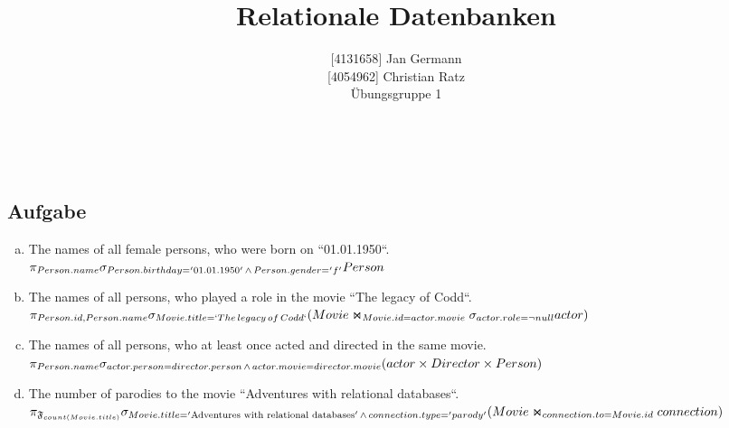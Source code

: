 \documentclass[11pt,a4paper,DIV=9]{scrartcl}
\author{{[}4131658{]} Jan Germann \\{[}4054962{]} Christian Ratz\\Übungsgruppe 1}
\title{Relationale Datenbanken}
\newcounter{temp}
\newcommand{\aufgabe}[1]{
  \setcounter{temp}{\value{subsection}}
  \setcounter{subsection}{#1}
  \addtocounter{subsection}{-1}
  \subsection{Aufgabe}
  \setcounter{subsection}{\value{temp}}
}
\renewcommand{\author}[1]{\renewcommand{\author}{#1}}
\renewcommand{\title}[1]{\renewcommand{\title}{#1}}
\newcommand{\makehomeworktitle}{
  \begin{minipage}[t]{6.5cm}
    \sf{\author}
  \end{minipage}
  \begin{minipage}[t]{6.5cm}
    \begin{flushright}
      \sf{\title\\\today}
    \end{flushright}
  \end{minipage}
  \\[0.2cm]
  \begin{center}
    \sf{
      \color{blue}{
        \LARGE{Aufgabenblatt \blattnr}
      }
    }
  \end{center}
  \vspace{0.1cm}
}
\begin{document}
\makehomeworktitle
\aufgabe{1}
  \begin{enumerate}[a)]
    \item The names of all female persons, who were born on ``01.01.1950``.\hfill\\
      $
      \pi_{Person.name}\\
      \sigma_{Person.birthday = '01.01.1950'\,\wedge\,Person.gender = 'f'}\\
      Person
      $
    \item The names of all persons, who played a role in the movie ``The legacy of Codd``. \hfill\\
      $
      \pi _{Person.id, Person.name}\\
      \sigma _{Movie.title=`{The\, legacy\, of\, Codd`}}\\
      (Movie\Join_{Movie.id = actor.movie} \sigma _{actor.role = \neg null} actor)
      $
    \item The names of all persons, who at least once acted and directed in the same movie.\hfill\\
      $
      \pi _{Person.name}\\
      \sigma _{actor.person = director.person \,\wedge\, actor.movie = director.movie}\\
      (actor \times Director \times Person)
      $
    \item The number of parodies to the movie ``Adventures with relational databases``.
      $
      \pi_{\mathfrak{F}_{count(Movie.title)}} \\
      \sigma_{Movie.title = '\textrm{Adventures with relational databases}' \,\wedge\, connection.type = 'parody'}\\
      (Movie\Join_{connection.to = Movie.id}connection)
      $


\end{enumerate}
\end{document}
